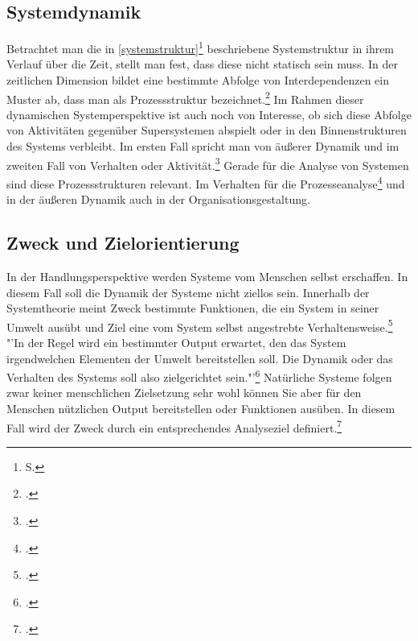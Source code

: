 \documentclass[a4paper,12pt]{article}
\begin{document}
\subsection{Systemdynamik}\label{systemdynamik}
Betrachtet man die in \ref{systemstruktur}\footnote{S. \pageref{systemstruktur}} beschriebene Systemstruktur in ihrem Verlauf über die Zeit, stellt man fest, dass diese nicht statisch sein muss. In der zeitlichen Dimension bildet eine bestimmte Abfolge von Interdependenzen ein Muster ab, dass man als Prozessstruktur bezeichnet.\footcite[S. 110]{Ulrich1968} Im Rahmen dieser dynamischen Systemperspektive ist auch noch von Interesse, ob sich diese Abfolge von Aktivitäten gegenüber Supersystemen abspielt oder in den Binnenstrukturen des Systems verbleibt. Im ersten Fall spricht man von äußerer Dynamik und im zweiten Fall von Verhalten oder Aktivität.\footcite[S. 113]{Ulrich1968} Gerade für die Analyse von Systemen sind diese Prozessstrukturen relevant. Im Verhalten für die Prozesseanalyse\footcite[S. 114]{Ulrich1968} und in der äußeren Dynamik auch in der Organisationsgestaltung.

\subsection{Zweck und Zielorientierung}\label{zweckundziel}
In der Handlungsperspektive werden Systeme vom Menschen selbst erschaffen. In diesem Fall soll die Dynamik der Systeme nicht ziellos sein. Innerhalb der Systemtheorie meint Zweck bestimmte Funktionen, die ein System in seiner Umwelt ausübt und Ziel eine vom System selbst angestrebte Verhaltensweise.\footcite[S. 114]{Ulrich1968} "'In der Regel wird ein bestimmter Output erwartet, den das System irgendwelchen Elementen der Umwelt bereitstellen soll. Die Dynamik oder das Verhalten des Systems soll also zielgerichtet sein."'\footcite[S. 114]{Ulrich1968} Natürliche Systeme folgen zwar keiner menschlichen Zielsetzung sehr wohl können Sie aber für den Menschen nützlichen Output bereitstellen oder Funktionen ausüben. In diesem Fall wird der Zweck durch ein entsprechendes Analyseziel definiert.\footcite[S. 114]{Ulrich1968}
\end{document}
